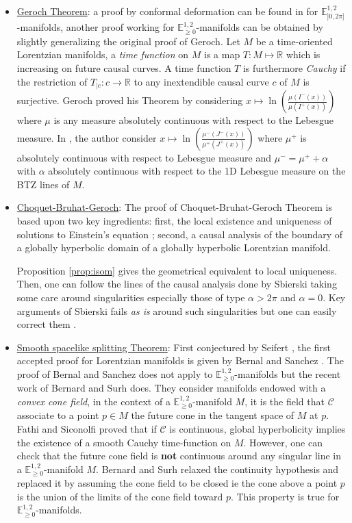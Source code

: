 \documentclass[a4paper,12pt]{article}
\def\RR{\mathbb{R}}
\newcommand{\mass}[1]{{\mathbb E}^{1,2}_{#1}}
\begin{document}
\begin{itemize}
\item \underline{Geroch Theorem}: a proof by conformal deformation can be found in \cite{Particules_1} for $\mass{]0,2\pi]}$-manifolds, another proof working for $\mass{\geq0}$-manifolds can be obtained by slightly generalizing the original proof of Geroch. Let $M$ be a time-oriented Lorentzian manifolds, a {\it time function} on $M$ is a map $T: M\mapsto \RR$ which is increasing on future causal curves. A time function $T$ is furthermore {\it Cauchy}  if the restriction of $T_{|c}: c \rightarrow \RR$ to any inextendible causal curve $c$ of $M$ is surjective. Geroch proved his Theorem by considering $x\mapsto\ln\left(\frac{\mu(I^-(x))}{\mu(I^+(x))}\right)$ where $\mu$ is any measure absolutely continuous with respect to the Lebesgue measure.  In \cite{thesis}, the author consider $x\mapsto\ln\left(\frac{\mu^-(J^-(x))}{\mu^+(J^+(x))}\right)$ where $\mu^+$ is absolutely continuous with respect to Lebesgue measure and $\mu^- = \mu^+ + \alpha $ with $\alpha $ absolutely continuous with respect to the 1D Lebesgue measure on the BTZ lines of $M$.

\item \underline{Choquet-Bruhat-Geroch}: The proof of Choquet-Bruhat-Geroch Theorem is based upon two  key ingredients: first, the local existence and uniqueness of solutions to Einstein's equation \cite{MR0053338,MR2527641}; second, a causal analysis of the boundary of a globally hyperbolic domain of a globally hyperbolic Lorentzian manifold.  

  Proposition \ref{prop:isom} gives the geometrical equivalent to  local uniqueness.  Then, one can follow the lines of the causal analysis done by Sbierski \cite{sbierski_geroch} taking some care around singularities especially those of type $\alpha>2\pi$ and $\alpha=0$. Key arguments of Sbierski fails {\it as is}  around such singularities but one can easily correct them \cite{thesis}.  
\item \underline{Smooth spacelike splitting Theorem}: First conjectured by Seifert \cite{Seifert1977}, the first accepted proof for Lorentzian manifolds is given by Bernal and Sanchez \cite{sanchez_smooth}. The proof of Bernal and Sanchez does not apply to $\mass{\geq 0}$-manifolds but the recent work of Bernard and Surh \cite{MR3783554} does. 
They consider manifolds endowed with a {\it convex cone field}, in the context of a $\mass{\geq0}$-manifold $M$, it is the field that $\mathcal C$ associate to a point $p\in M$ the future cone in the tangent space of $M$ at $p$. Fathi and Siconolfi \cite{MR2887877} proved that if $\mathcal C$ is continuous, global hyperbolicity implies the existence of a smooth Cauchy time-function on $M$. However, one can check that the future cone field is \textbf{not} continuous around any singular line in a $\mass{\geq0}$-manifold $M$. Bernard and Surh relaxed the continuity hypothesis  and replaced it by assuming the cone field to be closed ie the cone above a point $p$ is the union of the limits of the cone field toward $p$. 
This property is true for $\mass{\geq0}$-manifolds.
 
\end{itemize}
\end{document}
